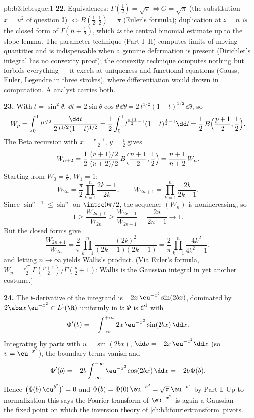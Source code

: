 \begin{solution}{pb:b3:lebesgue:1}
\textbf{22.} Equivalences: $\Gamma(\frac12) = \sqrt\pi
\Leftrightarrow G = \sqrt\pi$ (the substitution $x = u^2$ of
question 3) $\Leftrightarrow B(\frac12, \frac12) = \pi$
(Euler's formula); duplication at $z = n$ \emph{is} the
closed form of $\Gamma(n + \frac12)$, which \emph{is} the
central binomial estimate up to the slope lemma. The
parameter technique (Part I--II) computes limits of moving
quantities and is indispensable when a genuine deformation is
present (Dirichlet's integral has no convexity proof); the
convexity technique computes nothing but forbids everything
--- it excels at uniqueness and functional equations
(Gauss, Euler, Legendre in three strokes), where
differentiation would drown in computation. A 
analyst carries both.

\textbf{23.} With $t = \sin^2\theta$, $\dd t =
2\sin\theta\cos\theta\,\dd\theta =
2\,t^{1/2}(1-t)^{1/2}\,\dd\theta$, so
\[
W_p = \int_0^1 t^{p/2}\,
\frac{\dd t}{2\,t^{1/2}(1-t)^{1/2}}
= \frac12\int_0^1 t^{\frac{p+1}2 - 1}(1-t)^{\frac12 - 1}\dd t
= \frac12\,B\Bigl(\frac{p+1}2, \frac12\Bigr).
\]
The Beta recursion with $x = \frac{n+1}2$, $y = \frac12$
gives
\[
W_{n+2} = \frac12\,
\frac{(n+1)/2}{(n+2)/2}\,B\Bigl(\frac{n+1}2, \frac12\Bigr)
= \frac{n+1}{n+2}\,W_n .
\]
Starting from $W_0 = \frac\pi2$, $W_1 = 1$:
\[
W_{2n} = \frac\pi2\prod_{k=1}^n\frac{2k-1}{2k},
\qquad
W_{2n+1} = \prod_{k=1}^n\frac{2k}{2k+1} .
\]
Since $\sin^{n+1} \leq \sin^n$ on $\intcc0{\pi/2}$, the
sequence $(W_n)$ is nonincreasing, so
\[
1 \geq \frac{W_{2n+1}}{W_{2n}} \geq
\frac{W_{2n+1}}{W_{2n-1}} = \frac{2n}{2n+1}
\longrightarrow 1 .
\]
But the closed forms give
\[
\frac{W_{2n+1}}{W_{2n}} = \frac2\pi
\prod_{k=1}^n\frac{(2k)^2}{(2k-1)(2k+1)}
= \frac2\pi\prod_{k=1}^n\frac{4k^2}{4k^2-1},
\]
and letting $n \to \infty$ yields Wallis's product. (Via
Euler's formula, $W_p = \frac{\sqrt\pi}2\,
\Gamma(\frac{p+1}2)/\Gamma(\frac p2 + 1)$: Wallis is the
Gaussian integral in yet another costume.)

\textbf{24.} The $b$-derivative of the integrand is
$-2x\,\eu^{-x^2}\sin(2bx)$, dominated by $2\abs
x\,\eu^{-x^2} \in L^1(\R)$ uniformly in $b$: $\Phi$ is
$\mathcal C^1$ with
\[
\Phi'(b) = -\int_{-\infty}^{+\infty}
2x\,\eu^{-x^2}\sin(2bx)\,\dd x .
\]
Integrating by parts with $u = \sin(2bx)$, $\dd v =
-2x\,\eu^{-x^2}\dd x$ (so $v = \eu^{-x^2}$), the boundary
terms vanish and
\[
\Phi'(b) = -2b\int_{-\infty}^{+\infty}
\eu^{-x^2}\cos(2bx)\,\dd x = -2b\,\Phi(b).
\]
Hence $\bigl(\Phi(b)\,\eu^{b^2}\bigr)' = 0$ and $\Phi(b) =
\Phi(0)\,\eu^{-b^2} = \sqrt\pi\,\eu^{-b^2}$ by Part I. Up to
normalization this says the Fourier transform of
$\eu^{-x^2}$ is again a Gaussian --- the fixed point on which
the inversion theory of \cref{ch:b3:fouriertransform} pivots.


\end{solution}
